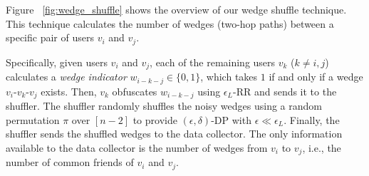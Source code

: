 

Figure ~\ref{fig:wedge_shuffle} shows the overview of our wedge shuffle technique. 
This technique calculates the number of wedges (two-hop paths) between 
a specific pair of users $v_i$ and $v_j$. 

Specifically, 
given users $v_i$ and $v_j$, 
each of the remaining users $v_k$ ($k \ne i, j$) 
calculates a \textit{wedge indicator} $w_{i-k-j} \in \{0,1\}$, 
which 
takes $1$ if and only if 
a wedge $v_i$-$v_k$-$v_j$ exists. 
Then, $v_k$ obfuscates $w_{i-k-j}$ using $\epsilon_L$-RR and sends it to the shuffler. 
The shuffler randomly shuffles the noisy wedges using a random permutation $\pi$ over $[n-2]$ 
to provide $(\epsilon, \delta)$-DP with $\epsilon \ll \epsilon_L$. 
Finally, the shuffler sends the shuffled wedges to the data collector. 
The only information available to the data collector is  the number of wedges from $v_i$ to $v_j$, i.e., the number of common friends of $v_i$ and $v_j$. 

